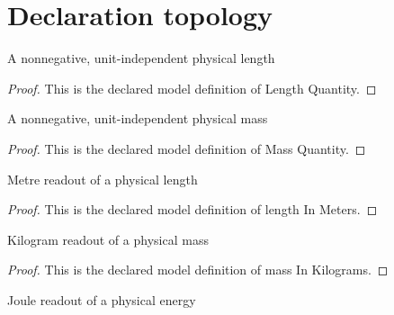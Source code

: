 \section{Declaration topology}
\begin{definition}
  \label{def:physics:phyx-mini-0545:phyxminiproblems-problemphyxmini0545-lengthquantity}
  A nonnegative, unit-independent physical length
\end{definition}
\begin{proof}
  This is the declared model definition of Length Quantity.
\end{proof}
\begin{definition}
  \label{def:physics:phyx-mini-0545:phyxminiproblems-problemphyxmini0545-massquantity}
  A nonnegative, unit-independent physical mass
\end{definition}
\begin{proof}
  This is the declared model definition of Mass Quantity.
\end{proof}
\begin{definition}
  \label{def:physics:phyx-mini-0545:phyxminiproblems-problemphyxmini0545-lengthinmeters}
  Metre readout of a physical length
\end{definition}
\begin{proof}
  This is the declared model definition of length In Meters.
\end{proof}
\begin{definition}
  \label{def:physics:phyx-mini-0545:phyxminiproblems-problemphyxmini0545-massinkilograms}
  Kilogram readout of a physical mass
\end{definition}
\begin{proof}
  This is the declared model definition of mass In Kilograms.
\end{proof}
\begin{definition}
  \label{def:physics:phyx-mini-0545:phyxminiproblems-problemphyxmini0545-energyinjoules}
  Joule readout of a physical energy
\end{definition}

